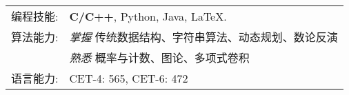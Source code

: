 %
%


 
\renewcommand{\arraystretch}{1.1}

	\begin{tabular}{>{}r>{}p{13cm}} 
		\textsc{编程技能:}      &  \textbf{C/C++}, Python, Java, \LaTeX.\\  
		\textsc{算法能力:}	    &  \emph{掌握}  传统数据结构、字符串算法、动态规划、数论反演  \\
		                 	   &  \emph{熟悉}  概率与计数、图论、多项式卷积  \\
		\textsc{语言能力:} 		&  CET-4: 565, CET-6: 472\\
	\end{tabular}